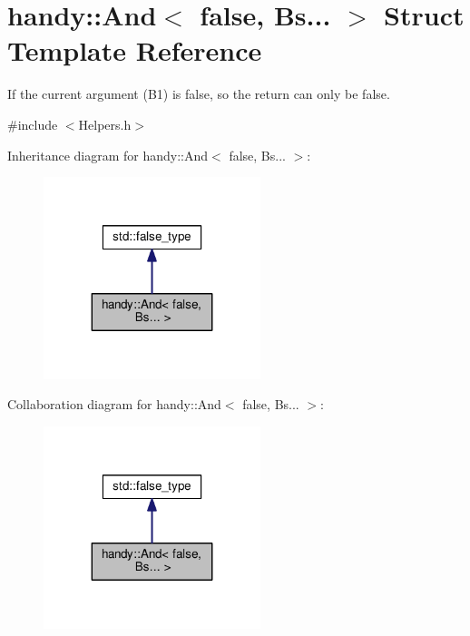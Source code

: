 \hypertarget{structhandy_1_1And_3_01false_00_01Bs_8_8_8_01_4}{}\section{handy\+:\+:And$<$ false, Bs... $>$ Struct Template Reference}
\label{structhandy_1_1And_3_01false_00_01Bs_8_8_8_01_4}


If the current argument ({\ttfamily B1}) is {\ttfamily false}, so the return can only be {\ttfamily false}.  




{\ttfamily \#include $<$Helpers.\+h$>$}



Inheritance diagram for handy\+:\+:And$<$ false, Bs... $>$\+:\nopagebreak
\begin{figure}[H]
\begin{center}
\leavevmode
\includegraphics[width=179pt]{structhandy_1_1And_3_01false_00_01Bs_8_8_8_01_4__inherit__graph}
\end{center}
\end{figure}


Collaboration diagram for handy\+:\+:And$<$ false, Bs... $>$\+:\nopagebreak
\begin{figure}[H]
\begin{center}
\leavevmode
\includegraphics[width=179pt]{structhandy_1_1And_3_01false_00_01Bs_8_8_8_01_4__coll__graph}
\end{center}
\end{figure}


